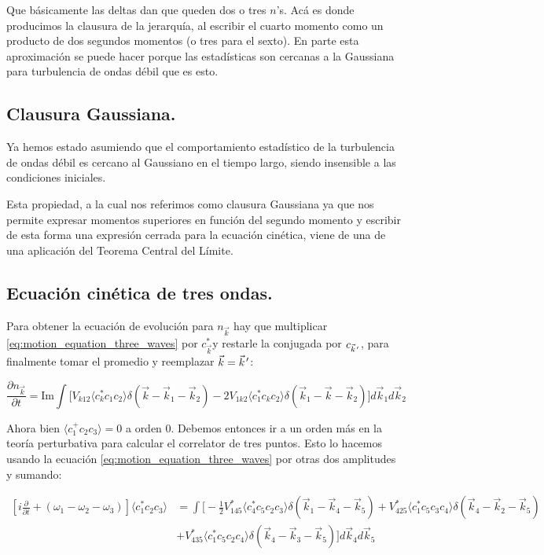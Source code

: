 Que básicamente las deltas dan que queden dos o tres  $n$'s. Acá es donde producimos la clausura de la jerarquía, al escribir el cuarto momento como un producto de dos segundos momentos (o tres para el sexto). En parte esta aproximación se puede hacer porque las estadísticas son cercanas a la Gaussiana para turbulencia de ondas débil que es esto. \cite{falkovichTurbulence2006} 

\subsection*{Clausura Gaussiana.}
Ya hemos estado asumiendo que el comportamiento estadístico de la turbulencia de ondas débil es cercano al Gaussiano en el tiempo largo, siendo insensible a las condiciones iniciales. \cite{falconLaboratoryExperimentsWave2010} 

Esta propiedad, a la cual nos referimos como clausura Gaussiana ya que nos permite expresar momentos superiores en función del segundo momento y escribir de esta forma una expresión cerrada para la ecuación cinética, viene de una de una aplicación del Teorema Central del Límite. \cite{hasselmannNonlinearEnergyTransfer1962} 


\subsection*{Ecuación cinética de tres ondas.}
Para obtener la ecuación de evolución para $n_{\vec k}$ hay que multiplicar \eqref{eq:motion_equation_three_waves} por $c^*_{\vec k}$y restarle la conjugada por $c_{\pvec k'}$, para finalmente tomar el promedio y reemplazar $\vec k=\pvec k'$:

\begin{equation}
	\frac{\partial n_{\vec k}}{\partial t} = \text{Im} \int\big[V_{k12} \langle c_k^*c_1c_2 \rangle \delta(\vec k- \vec k_1 -\vec k_2) - 2V_{1k2}\langle c_1^*c_kc_2 \rangle \delta(\vec k_1 - \vec k - \vec k_2) \big] d\vec k_1 d\vec k_2
\end{equation} 

Ahora bien $\langle c_1^+c_2c_3 \rangle = 0$ a orden 0. Debemos entonces ir a un orden más en la teoría perturbativa para calcular el correlator de tres puntos. Esto lo hacemos usando la ecuación \eqref{eq:motion_equation_three_waves} por otras dos amplitudes y sumando:

\begin{equation}
	\begin{split}
		\left[i\frac{\partial}{\partial t} + (\omega_1-\omega_2-\omega_3)\right] \langle c_1^*c_2c_3 \rangle &= \int \bigg[-\frac{1}{2}V_{145}^*\langle c_4^*c_5c_2c_3 \rangle \delta(\vec k_1 - \vec k_4 -\vec k_5) + V_{425}^*\langle c_1^*c_5c_3c_4 \rangle \delta(\vec k_4 - \vec k_2 -\vec k_5) \\ 
		&+  V_{435}^*\langle c_1^*c_5c_2c_4 \rangle \delta(\vec k_4 - \vec k_3 -\vec k_5)\bigg] d\vec k_4 d\vec k_5
	\end{split}
\end{equation}

